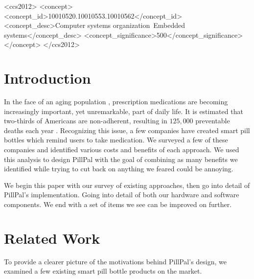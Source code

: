 \documentclass[sigconf]{acmart}
\begin{document}
\begin{CCSXML}
<ccs2012>
 <concept>
  <concept_id>10010520.10010553.10010562</concept_id>
  <concept_desc>Computer systems organization~Embedded systems</concept_desc>
  <concept_significance>500</concept_significance>
 </concept>
</ccs2012>
\end{CCSXML}



\maketitle
\section{Introduction}
In the face of an aging population \cite{nasser_2021}, prescription medications are becoming increasingly important, yet unremarkable, part of daily life. It is estimated that two-thirds of Americans are non-adherent, resulting in $125,000$ preventable deaths each year \cite{pillsy_info}. Recognizing this issue, a few companies have created smart pill bottles which remind users to take medication. We surveyed a few of these companies and identified various costs and benefits of each approach. We used this analysis to design PillPal with the goal of combining as many benefits we identified while trying to cut back on anything we feared could be annoying.

We begin this paper with our survey of existing approaches, then go into detail of PillPal's implementation. Going into detail of both our hardware and software components. We end with a set of items we see can be improved on further.

\section{Related Work}
To provide a clearer picture of the motivations behind PillPal's design, we examined a few existing smart pill bottle products on the market.
\end{document}
